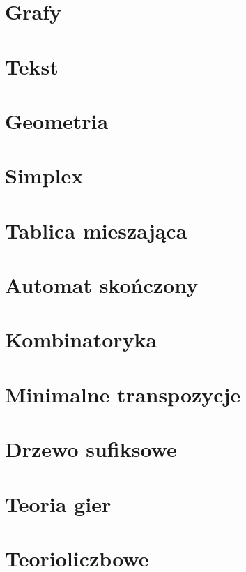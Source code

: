\documentclass{article}
\begin{document}
\section{Grafy}


\newpage
\section{Tekst}


\newpage
\section{Geometria}


\newpage
\section{Simplex}

\newpage
\section{Tablica mieszająca}


\newpage
\section{Automat skończony}

\newpage
\section{Kombinatoryka}

\newpage
\section{Minimalne transpozycje}

\newpage
\section{Drzewo sufiksowe}

\newpage
\section{Teoria gier}


\section{Teorioliczbowe}


\end{document}
